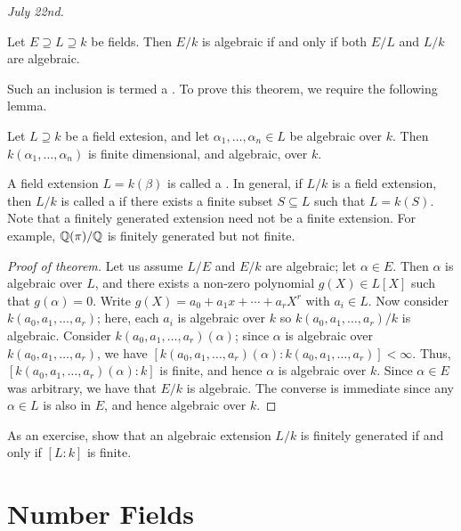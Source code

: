 \textit{July 22nd.}

\begin{theorem}
    Let $E \supseteq L \supseteq k$ be fields. Then $E/k$ is algebraic if and only if both $E/L$ and $L/k$ are algebraic.
\end{theorem}

Such an inclusion is termed a . To prove this theorem, we require the following lemma.

\begin{lemma}
    Let $L \supseteq k$ be a field extesion, and let $\alpha_{1},\ldots,\alpha_{n} \in L$ be algebraic over $k$. Then $k(\alpha_{1},\ldots,\alpha_{n})$ is finite dimensional, and algebraic, over $k$.
\end{lemma}

A field extension $L = k(\beta)$ is called a . In general, if $L/k$ is a field extension, then $L/k$ is called a  if there exists a finite subset $S \subseteq L$ such that $L = k(S)$. Note that a finitely generated extension need not be a finite extension. For example, $\mathbb{Q}(\pi)/\mathbb{Q}$ is finitely generated but not finite.

\begin{proof}[Proof of theorem]
    Let us assume $L/E$ and $E/k$ are algebraic; let $\alpha \in E$. Then $\alpha$ is algebraic over $L$, and there exists a non-zero polynomial $g(X) \in L[X]$ such that $g(\alpha) = 0$. Write $g(X) = a_{0} + a_{1}x + \cdots + a_{r}X^{r}$ with $a_{i} \in L$. Now consider $k(a_{0},a_{1},\ldots,a_{r})$; here, each $a_{i}$ is algebraic over $k$ so $k(a_{0},a_{1},\ldots,a_{r})/k$ is algebraic. Consider $k(a_{0},a_{1},\ldots,a_{r})(\alpha)$; since $\alpha$ is algebraic over $k(a_{0},a_{1},\ldots,a_{r})$, we have $[k(a_{0},a_{1},\ldots,a_{r})(\alpha) : k(a_{0},a_{1},\ldots,a_{r})] < \infty$. Thus, $[k(a_{0},a_{1},\ldots,a_{r})(\alpha) : k]$ is finite, and hence $\alpha$ is algebraic over $k$. Since $\alpha \in E$ was arbitrary, we have that $E/k$ is algebraic. The converse is immediate since any $\alpha \in L$ is also in $E$, and hence algebraic over $k$.
\end{proof}

\begin{example}
    As an exercise, show that an algebraic extension $L/k$ is finitely generated if and only if $[L:k]$ is finite.
\end{example}

\section{Number Fields}


